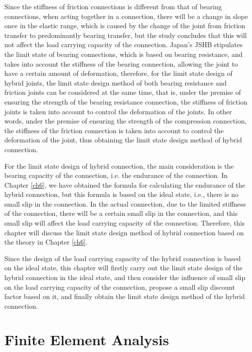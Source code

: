 Since the stiffness of friction connections is different from that of bearing connections, when acting together in a connection, there will be a change in slope once in the elastic range, which is caused by the change of the joint from friction transfer to predominantly bearing transfer, but the study concludes that this will not affect the load carrying capacity of the connection. Japan's JSHB stipulates the limit state of bearing connections, which is based on bearing resistance, and takes into account the stiffness of the bearing connection, allowing the joint to have a certain amount of deformation, therefore, for the limit state design of hybrid joints, the limit state design method of both bearing resistance and friction joints can be considered at the same time, that is, under the premise of ensuring the strength of the bearing resistance connection, the stiffness of friction joints is taken into account to control the deformation of the joints. In other words, under the premise of ensuring the strength of the compression connection, the stiffness of the friction connection is taken into account to control the deformation of the joint, thus obtaining the limit state design method of hybrid connection.

For the limit state design of hybrid connection, the main consideration is the bearing capacity of the connection, i.e. the endurance of the connection. In Chapter \ref{ch6}, we have obtained the formula for calculating the endurance of the hybrid connection, but this formula is based on the ideal state, i.e., there is no small slip in the connection. In the actual connection, due to the limited stiffness of the connection, there will be a certain small slip in the connection, and this small slip will affect the load carrying capacity of the connection. Therefore, this chapter will discuss the limit state design method of hybrid connection based on the theory in Chapter \ref{ch6}.

Since the design of the load carrying capacity of the hybrid connection is based on the ideal state, this chapter will firstly carry out the limit state design of the hybrid connection in the ideal state, and then consider the influence of small slip on the load carrying capacity of the connection, propose a small slip discount factor based on it, and finally obtain the limit state design method of the hybrid connection.

\section{Finite Element Analysis}

